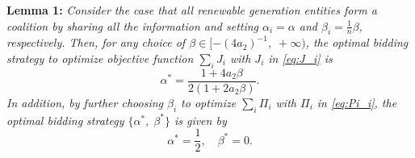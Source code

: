 \documentclass[journal]{IEEEtran}
\begin{document}
\noindent \textbf{Lemma 1:} {\it Consider the case that all renewable generation entities form a coalition by sharing all the information and setting $\alpha_i=\alpha$ and $\beta_i=\frac{1}{n}\beta$, respectively. Then, for any choice of $\beta\in[-(4a_2)^{-1},\; +\infty)$, the optimal bidding strategy to optimize objective function $\sum_i J_i$ with $J_i$ in \eqref{eq:J_i} is
\begin{equation}
\alpha^* = \frac{1 + 4a_2 \beta}{2(1 + 2a_2\beta)}.
\label{eq:alpha_1}
\end{equation}
In addition, by further choosing $\beta_i$ to optimize $\sum_i \Pi_i$ with $\Pi_i$ in \eqref{eq:Pi_i}, the optimal bidding strategy $\{\alpha^*, \; \beta^*\}$ is given by}
\begin{equation}
\alpha^*  =  \frac{1}{2}, \quad
\beta^*  =  0.
\label{eq:optimal_1}
\end{equation}
\end{document}
